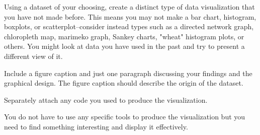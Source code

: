 \documentclass[]{book}
\theoremstyle{definition}
\newtheorem*{soln}{Solution}
\begin{document}
\begin{enumerate}
Using a dataset of your choosing, create a distinct type of data visualization that you have not made before. This means you may not make a bar chart, histogram, boxplots, or scatterplot–consider instead types such as a directed network graph, chloropleth map, marimeko graph, Sankey charts, "wheat" histogram plots, or others.  You might look at data you have used in the past and try to present a different view of it.  

Include a figure caption and just one paragraph discussing your findings and the graphical design. 
The figure caption should describe the origin of the dataset.

Separately attach any code you used to produce the visualization.

You do not have to use any specific tools to produce the visualization but you need to find something interesting and display it effectively.


\end{enumerate}
\end{document}
